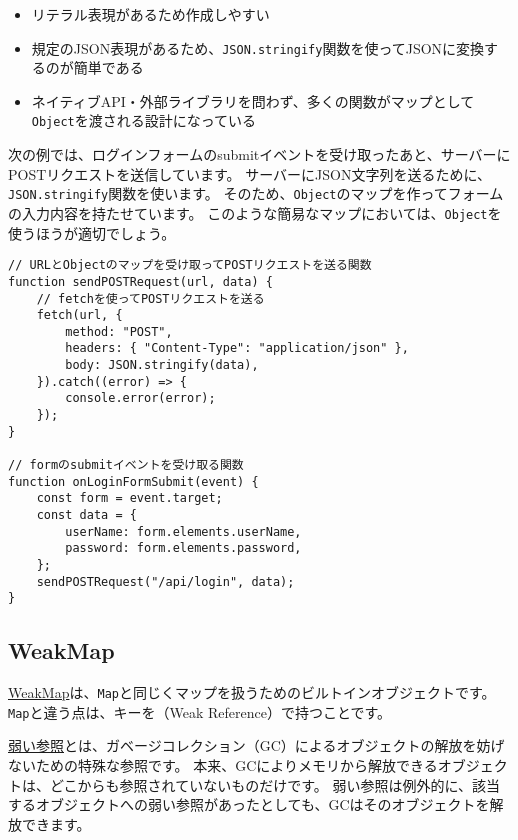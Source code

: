 \begin{itemize}
\item
  リテラル表現があるため作成しやすい
\item
  規定のJSON表現があるため、\texttt{JSON.stringify}関数を使ってJSONに変換するのが簡単である
\item
  ネイティブAPI・外部ライブラリを問わず、多くの関数がマップとして\texttt{Object}を渡される設計になっている
\end{itemize}

次の例では、ログインフォームのsubmitイベントを受け取ったあと、サーバーにPOSTリクエストを送信しています。
サーバーにJSON文字列を送るために、\texttt{JSON.stringify}関数を使います。
そのため、\texttt{Object}のマップを作ってフォームの入力内容を持たせています。
このような簡易なマップにおいては、\texttt{Object}を使うほうが適切でしょう。

\begin{lstlisting}
// URLとObjectのマップを受け取ってPOSTリクエストを送る関数
function sendPOSTRequest(url, data) {
    // fetchを使ってPOSTリクエストを送る
    fetch(url, {
        method: "POST",
        headers: { "Content-Type": "application/json" },
        body: JSON.stringify(data),
    }).catch((error) => {
        console.error(error);
    });
}

// formのsubmitイベントを受け取る関数
function onLoginFormSubmit(event) {
    const form = event.target;
    const data = {
        userName: form.elements.userName,
        password: form.elements.password,
    };
    sendPOSTRequest("/api/login", data);
}
\end{lstlisting}

\hypertarget{weakmap}{%
\subsection{WeakMap}\label{weakmap}}

\href{https://developer.mozilla.org/ja/docs/Web/JavaScript/Reference/Global_Objects/WeakMap}{WeakMap}は、\texttt{Map}と同じくマップを扱うためのビルトインオブジェクトです。
\texttt{Map}と違う点は、キーを\textbf{}（Weak
Reference）で持つことです。

\href{https://ja.wikipedia.org/wiki/\%E5\%BC\%B1\%E3\%81\%84\%E5\%8F\%82\%E7\%85\%A7}{弱い参照}とは、ガベージコレクション（GC）によるオブジェクトの解放を妨げないための特殊な参照です。
本来、GCによりメモリから解放できるオブジェクトは、どこからも参照されていないものだけです。
弱い参照は例外的に、該当するオブジェクトへの弱い参照があったとしても、GCはそのオブジェクトを解放できます。

